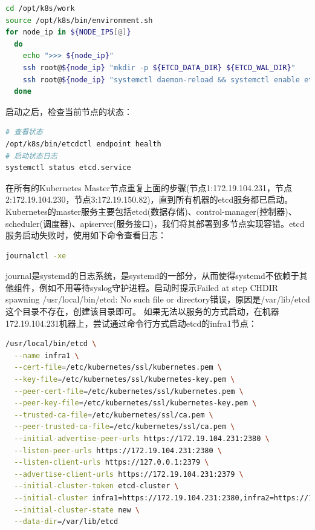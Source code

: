 \documentclass[8pt]{book}
\numberwithin{dummy}{section}
\theoremstyle{ocrenumbox}
\theoremstyle{blacknumex}
\theoremstyle{blacknumbox}
\theoremstyle{ocrenum}
\begin{document}
\begin{lstlisting}[language=Bash]
cd /opt/k8s/work
source /opt/k8s/bin/environment.sh
for node_ip in ${NODE_IPS[@]}
  do
    echo ">>> ${node_ip}"
    ssh root@${node_ip} "mkdir -p ${ETCD_DATA_DIR} ${ETCD_WAL_DIR}"
    ssh root@${node_ip} "systemctl daemon-reload && systemctl enable etcd && systemctl restart etcd " &
  done
\end{lstlisting}

启动之后，检查当前节点的状态：

\begin{lstlisting}[language=Bash]
# 查看状态
/opt/k8s/bin/etcdctl endpoint health
# 启动状态日志
systemctl status etcd.service
\end{lstlisting}

在所有的Kubernetes Master节点重复上面的步骤(节点1:172.19.104.231，节点2:172.19.104.230，节点3:172.19.150.82)，直到所有机器的etcd服务都已启动。Kubernetes的master服务主要包括etcd(数据存储)、control-manager(控制器)、scheduler(调度器)、apiserver(服务接口)，我们将其部署到多节点实现容错。etcd服务启动失败时，使用如下命令查看日志：

\begin{lstlisting}[language=Bash]
journalctl -xe
\end{lstlisting}

journal是systemd的日志系统，是systemd的一部分，从而使得systemd不依赖于其他组件，例如不用等待syslog守护进程。启动时提示Failed at step CHDIR spawning /usr/local/bin/etcd: No such file or directory错误，原因是/var/lib/etcd 这个目录不存在，创建该目录即可。	如果无法以服务的方式启动，在机器172.19.104.231机器上，尝试通过命令行方式启动etcd的infra1节点：

\begin{lstlisting}[language=Bash]
/usr/local/bin/etcd \
  --name infra1 \
  --cert-file=/etc/kubernetes/ssl/kubernetes.pem \
  --key-file=/etc/kubernetes/ssl/kubernetes-key.pem \
  --peer-cert-file=/etc/kubernetes/ssl/kubernetes.pem \
  --peer-key-file=/etc/kubernetes/ssl/kubernetes-key.pem \
  --trusted-ca-file=/etc/kubernetes/ssl/ca.pem \
  --peer-trusted-ca-file=/etc/kubernetes/ssl/ca.pem \
  --initial-advertise-peer-urls https://172.19.104.231:2380 \
  --listen-peer-urls https://172.19.104.231:2380 \
  --listen-client-urls https://127.0.0.1:2379 \
  --advertise-client-urls https://172.19.104.231:2379 \
  --initial-cluster-token etcd-cluster \
  --initial-cluster infra1=https://172.19.104.231:2380,infra2=https://172.19.104.230:2380,infra3=https://172.19.150.82:2380 \
  --initial-cluster-state new \
  --data-dir=/var/lib/etcd
\end{lstlisting}
\end{document}
